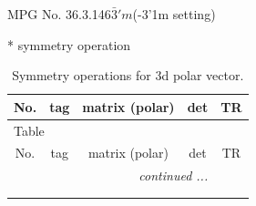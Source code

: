 \documentclass[fleqn,8pt]{jsarticle}
\begin{document}
\setcounter{MaxMatrixCols}{32}

\renewcommand{\tablename}{Table~}
\renewcommand{\figurename}{Figure~}
\begin{center}
\LARGE
MPG No. 36.3.146\quad$\bar{3}'m$\quad(-3'1m setting)
\end{center}
* symmetry operation
\renewcommand{\arraystretch}{1.3}
\begin{longtable}{ccccc}
\caption{Symmetry operations for 3d polar vector.}
 \\
 \hline \hline
No. & tag & matrix (polar) & det & TR \\ \hline \endfirsthead

\multicolumn{4}{l}{\tablename\ \thetable{}} \\
 \hline \hline
No. & tag & matrix (polar) & det & TR \\ \hline \endhead

 \hline \hline
\multicolumn{4}{r}{\footnotesize\it continued ...} \\ \endfoot

 \hline \hline
\multicolumn{4}{r}{} \\ \endlastfoot


\end{longtable}
\end{document}
